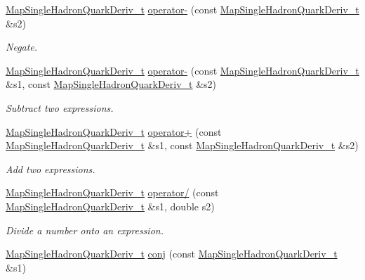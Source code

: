 \begin{DoxyCompactItemize}
\mbox{\hyperlink{namespaceHadron_aa588220689caea8a6aad4d0296526e6b}{Map\+Single\+Hadron\+Quark\+Deriv\+\_\+t}} \mbox{\hyperlink{namespaceHadron_a3420e25a6674cbce229ba6b98f1fa85a}{operator-\/}} (const \mbox{\hyperlink{namespaceHadron_aa588220689caea8a6aad4d0296526e6b}{Map\+Single\+Hadron\+Quark\+Deriv\+\_\+t}} \&s2)
\begin{DoxyCompactList}\small\item\em Negate. \end{DoxyCompactList}\item 
\mbox{\hyperlink{namespaceHadron_aa588220689caea8a6aad4d0296526e6b}{Map\+Single\+Hadron\+Quark\+Deriv\+\_\+t}} \mbox{\hyperlink{namespaceHadron_a064800b32b071a140c16ef8416cfa165}{operator-\/}} (const \mbox{\hyperlink{namespaceHadron_aa588220689caea8a6aad4d0296526e6b}{Map\+Single\+Hadron\+Quark\+Deriv\+\_\+t}} \&s1, const \mbox{\hyperlink{namespaceHadron_aa588220689caea8a6aad4d0296526e6b}{Map\+Single\+Hadron\+Quark\+Deriv\+\_\+t}} \&s2)
\begin{DoxyCompactList}\small\item\em Subtract two expressions. \end{DoxyCompactList}\item 
\mbox{\hyperlink{namespaceHadron_aa588220689caea8a6aad4d0296526e6b}{Map\+Single\+Hadron\+Quark\+Deriv\+\_\+t}} \mbox{\hyperlink{namespaceHadron_afa83538fb097946f87e6f98180c378b5}{operator+}} (const \mbox{\hyperlink{namespaceHadron_aa588220689caea8a6aad4d0296526e6b}{Map\+Single\+Hadron\+Quark\+Deriv\+\_\+t}} \&s1, const \mbox{\hyperlink{namespaceHadron_aa588220689caea8a6aad4d0296526e6b}{Map\+Single\+Hadron\+Quark\+Deriv\+\_\+t}} \&s2)
\begin{DoxyCompactList}\small\item\em Add two expressions. \end{DoxyCompactList}\item 
\mbox{\hyperlink{namespaceHadron_aa588220689caea8a6aad4d0296526e6b}{Map\+Single\+Hadron\+Quark\+Deriv\+\_\+t}} \mbox{\hyperlink{namespaceHadron_aee22779796ebd9e7ee8772c1eb965b6c}{operator/}} (const \mbox{\hyperlink{namespaceHadron_aa588220689caea8a6aad4d0296526e6b}{Map\+Single\+Hadron\+Quark\+Deriv\+\_\+t}} \&s1, double s2)
\begin{DoxyCompactList}\small\item\em Divide a number onto an expression. \end{DoxyCompactList}\item 
\mbox{\hyperlink{namespaceHadron_aa588220689caea8a6aad4d0296526e6b}{Map\+Single\+Hadron\+Quark\+Deriv\+\_\+t}} \mbox{\hyperlink{namespaceHadron_a218b77b239d871def6267d4b34bdf7c1}{conj}} (const \mbox{\hyperlink{namespaceHadron_aa588220689caea8a6aad4d0296526e6b}{Map\+Single\+Hadron\+Quark\+Deriv\+\_\+t}} \&s1)

\end{DoxyCompactItemize}
